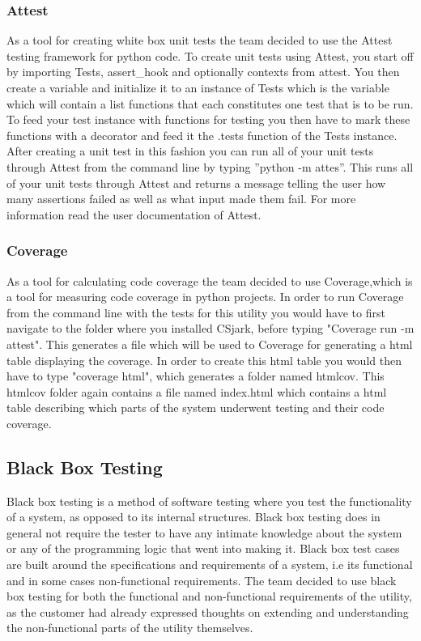 \subsubsection{Attest}
As a tool for creating white box unit tests the team decided to use the Attest testing framework for python code. To create unit tests using Attest, you start off by importing Tests, assert\_hook and optionally contexts from attest. You then create a variable and initialize it to an instance of Tests which is the variable which will contain a list functions that each constitutes one test that is to be run. To feed your test instance with functions for testing you then have to mark these functions with a decorator and feed it the .tests function of the Tests instance. After creating a unit test in this fashion you can run all of your unit tests through Attest from the command line by typing ''python -m attes''. This runs all of your unit tests through Attest and returns a message telling the user how many assertions failed as well as what input made them fail. For more information read the user documentation of Attest. 

\subsubsection{Coverage}
As a tool for calculating code coverage the team decided to use Coverage,which is a tool for measuring code coverage in python projects. In order to run Coverage from the command line with the tests for this utility you would have to first navigate to the folder where you installed CSjark, before typing "Coverage run -m attest". This generates a file which will be used to Coverage for generating a html table displaying the coverage. In order to create this html table you would then have to type "coverage html", which generates a folder named htmlcov. This htmlcov folder again contains a file named index.html which contains a html table describing which parts of the system underwent testing and their code coverage.


\subsection{Black Box Testing}
Black box testing is a method of software testing where you test the functionality of a system, as opposed to its internal structures. Black box testing does in general not require the tester to have any intimate knowledge about the system or any of the programming logic that went into making it. Black box test cases are built around the specifications and requirements of a system, i.e its functional and in some cases non-functional requirements. The team decided to use black box testing for both the functional and non-functional requirements of the \gls{utility}, as the customer had already expressed thoughts on extending and understanding the non-functional parts of the \gls{utility} themselves. 

